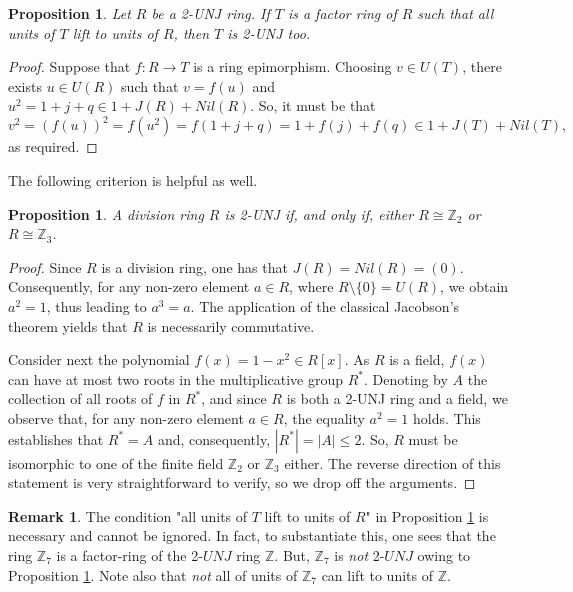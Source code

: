 \documentclass[12pt]{amsart}
\newtheorem{proposition}[theorem]{Proposition}
\theoremstyle{definition}
\newtheorem{remark}[theorem]{Remark}
\begin{document}
\begin{proposition}\label{3.2}
Let \(R\) be a 2-UNJ ring. If \(T\) is a factor ring of \(R\) such that all units of \(T\) lift to units of \(R\), then \(T\) is 2-UNJ too.
\end{proposition}

\begin{proof}
Suppose that \(f: R \rightarrow T\) is a ring epimorphism. Choosing \(v \in U(T)\), there exists \(u \in U(R)\) such that \(v = f(u)\) and \(u^2 = 1 + j+q \in 1 + J(R)+Nil(R)\). So, it must be that \[v^2 = (f(u))^2 = f(u^2) = f(1 + j+q) = 1 + f(j)+f(q) \in 1 + J(T)+Nil(T),\] as required.
\end{proof}

The following criterion is helpful as well.

\begin{proposition}\label{3.3}
A division ring \(R\) is 2-UNJ if, and only if, either \(R \cong \mathbb{Z}_2\) or \(R \cong \mathbb{Z}_3\).
\end{proposition}

\begin{proof}
Since \(R\) is a division ring, one has that $J(R)=Nil(R)=(0)$. Consequently, for any non-zero element $a \in R$, where $R  \setminus \{0\} = U(R)$, we obtain $a^2 = 1$, thus leading to $a^3 = a$. The application of the classical Jacobson's theorem yields that $R$ is necessarily commutative.

Consider next the polynomial $f(x) = 1 - x^2 \in R[x]$. As $R$ is a field, $f(x)$ can have at most two roots in the multiplicative group $R^{\ast}$. Denoting by $A$ the collection of all roots of $f$ in $R^{\ast}$, and since $R$ is both a 2-UNJ ring and a field, we observe that, for any non-zero element $a \in R$, the equality $a^2 = 1$ holds. This establishes that $R^* = A$ and, consequently, $|R^{\ast}| = |A| \leq 2$. So, $R$ must be isomorphic to one of the finite field $\mathbb{Z}_2$ or $\mathbb{Z}_3$ either. The reverse direction of this statement is very straightforward to verify, so we drop off the arguments.
\end{proof}

\begin{remark}
The condition "all units of $T$ lift to units of $R$" in Proposition \ref{3.2} is necessary and cannot be ignored. In fact, to substantiate this, one sees that the ring $\mathbb{Z}_7$ is a factor-ring of the 2-$UNJ$ ring $\mathbb{Z}$. But, $\mathbb{Z}_7$ is {\it not} 2-$UNJ$ owing to Proposition \ref{3.3}. Note also that {\it not} all of units of $\mathbb{Z}_7$ can lift to units of $\mathbb{Z}$.
\end{remark}
\end{document}
